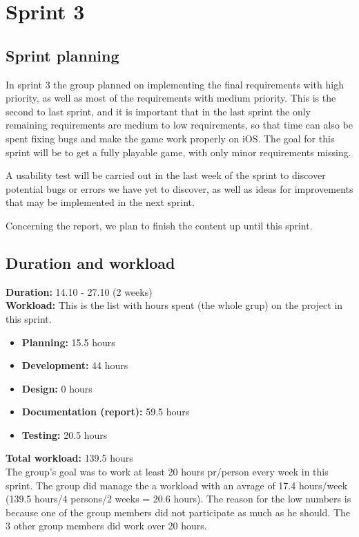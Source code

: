 \section{Sprint 3}

\subsection{Sprint planning}
	In sprint 3 the group planned on implementing the final requirements with high priority, as well as most of the requirements with medium priority. This is the second to last sprint, and it is important that in the last sprint the  only remaining requirements are medium to low requirements, so that time can also be spent fixing bugs and make the game work properly on iOS. The goal for this sprint will be to get a fully playable game, with only minor requirements missing.

	A usability test will be carried out in the last week of the sprint to discover potential bugs or errors we have yet to discover, as well as ideas for improvements that may be implemented in the next sprint.

	Concerning the report, we plan to finish the content up until this sprint.

\subsection{Duration and workload}
	
	{\bf Duration:} 14.10 - 27.10 (2 weeks)\\
	{\bf Workload:} This is the list with hours spent (the whole grup) on the project in this sprint.
	\begin{itemize}
		\item {\bf Planning:} 15.5 hours
		\item {\bf Development:} 44 hours
		\item {\bf Design:} 0 hours
		\item {\bf Documentation (report):} 59.5 hours
		\item {\bf Testing:} 20.5 hours 
	\end{itemize}
	{\bf Total workload: } 139.5 hours \\
	The group's goal was to work at least 20 hours pr/person every week in this sprint. 
	The group did manage the a workload with an avrage of 17.4 hours/week (139.5 hours/4 persons/2 weeks = 20.6 hours). The reason for the low numbers is because one of the group members did not
	participate as much as he should. The 3 other group members did work over 20 hours. 



